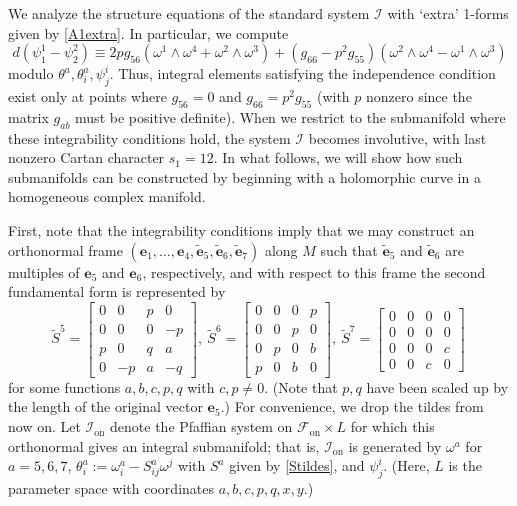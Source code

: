 \documentclass[12pt,reqno]{amsart}
\theoremstyle{definition}
\theoremstyle{remark}
\begin{document}
We analyze the structure equations of the standard system ${{\mathcal I}}$ with
`extra' 1-forms given by \eqref{A1extra}.  In particular, we compute
$$d(\psi^1_1 - \psi^2_2) \equiv 2 p g_{56}({\omega}^1{\wedge}{\omega}^4 + {\omega}^2{\wedge}{\omega}^3)+ (g_{66}-p^2 g_{55})({\omega}^2 {\wedge} {\omega}^4 - {\omega}^1 {\wedge} {\omega}^3)$$
modulo $\theta^a, \theta^a_i, \psi^i_j$.
Thus, integral elements satisfying the independence condition
exist only at points where  $g_{56}=0$ and $g_{66}=p^2 g_{55}$ (with $p$ nonzero
since the matrix $g_{ab}$ must be positive definite).
When we restrict to the submanifold where these integrability conditions hold,
the system ${{\mathcal I}}$ becomes involutive, with last nonzero Cartan character $s_1=12$.
In what follows, we will show how such submanifolds can be constructed by beginning
with a holomorphic curve in a homogeneous complex manifold.

First, note that the integrability conditions imply that we may construct an orthonormal
frame $({\mathbf e}_1, \ldots, {\mathbf e}_4, {\tilde {\mathbf e}}_5, {\tilde {\mathbf e}}_6, {\tilde {\mathbf e}}_7)$ along $M$ such that ${\tilde {\mathbf e}}_5$ and
${\tilde {\mathbf e}}_6$ are multiples of ${\mathbf e}_5$ and ${\mathbf e}_6$, respectively, and with respect to this frame
the second fundamental form is represented by
\[\label{Stildes}
\tilde S^5 = \begin{bmatrix} 0 & 0 & p & 0 \\ 0 & 0 & 0 & -p \\ p & 0 & q & a \\ 0 & -p & a &-q \end{bmatrix},\
\tilde S^6 = \begin{bmatrix} 0 & 0 & 0 & p \\ 0 & 0 & p & 0\\ 0 & p & 0 & b\\ p & 0 & b & 0\end{bmatrix},\
\tilde S^7 = \begin{bmatrix} 0 & 0 & 0 & 0  \\  0 & 0 & 0 & 0  \\ 0 & 0 & 0 & c\\ 0 & 0 & c & 0 \end{bmatrix}\
\]
for some functions $a,b,c,p,q$ with $c,p\ne 0$.  (Note that $p,q$ have been scaled
up by the length of the original vector ${\mathbf e}_5$.)  For convenience, we drop the tildes from now on.
Let ${{{\mathcal I}}_{\operatorname{on}}}$ denote the Pfaffian system on ${{\mathscr F}_{\operatorname{on}}} \times L$ for which this orthonormal
gives an integral submanifold; that is, ${{{\mathcal I}}_{\operatorname{on}}}$ is generated by ${\omega}^a$ for $a=5,6,7$, $\theta^a_i:={\omega}^a_i-S^a_{ij}{\omega}^j$
with $S^a$ given by \eqref{Stildes}, and $\psi^i_j$.  (Here, $L$ is the parameter
space with coordinates $a,b,c,p,q,x,y$.)
\end{document}
